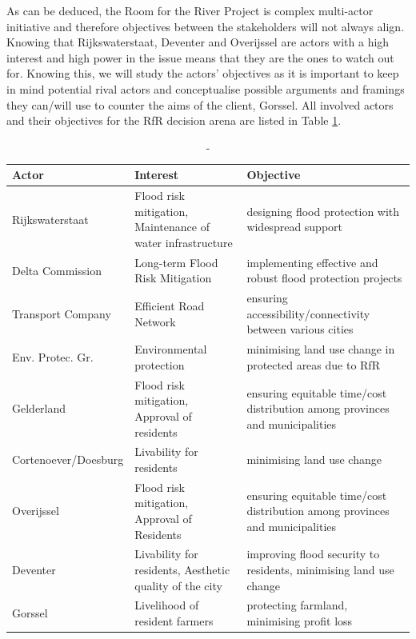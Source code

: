 As can be deduced, the Room for the River Project is complex multi-actor initiative and therefore objectives between the stakeholders will not always align. Knowing that Rijkswaterstaat, Deventer and Overijssel are actors with a high interest and high power in the issue means that they are the ones to watch out for. Knowing this, we will study the actors' objectives as it is important to keep in mind potential rival actors and conceptualise possible arguments and framings they can/will use to counter the aims of the client, Gorssel. All involved actors and their objectives for the RfR decision arena are listed in Table \ref{t:actortable}.

\begin{table}[h!]
\caption{-}
\begin{tabular}{p{}p{}p{}}
\hline 
Actor & Interest & Objective \\ \hline
Rijkswaterstaat         & Flood risk mitigation, Maintenance of water infrastructure & designing flood protection with widespread support \\ 
Delta Commission        & Long-term Flood Risk Mitigation & implementing effective and robust flood protection projects \\
Transport Company       & Efficient Road Network & ensuring accessibility/connectivity between various cities \\
Env. Protec. Gr.        & Environmental protection & minimising land use change in protected areas due to RfR \\
Gelderland              & Flood risk mitigation, Approval of residents & ensuring equitable time/cost distribution among provinces and municipalities \\
Cortenoever/Doesburg    & Livability for residents & minimising land use change \\
Overijssel              & Flood risk mitigation, Approval of Residents & ensuring equitable time/cost distribution among provinces and municipalities \\
Deventer                & Livability for residents, Aesthetic quality of the city & improving flood security to residents, minimising land use change \\
Gorssel                & Livelihood of resident farmers & protecting farmland, minimising profit loss \\
\end{tabular}
\label{t:actortable}
\end{table}

